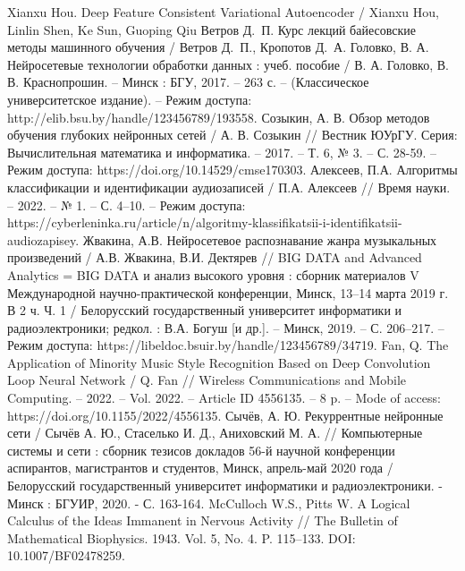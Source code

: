 \begin{thebibliography}{99}
 Xianxu Hou. Deep Feature Consistent Variational Autoencoder / Xianxu Hou, Linlin Shen, Ke Sun, Guoping Qiu
 Ветров Д.~П. Курс лекций байесовские методы машинного обучения / Ветров Д.~П., Кропотов Д.~А.
 Головко, В. А. Нейросетевые технологии обработки данных : учеб. пособие / В. А. Головко, В. В. Краснопрошин. – Минск : БГУ, 2017. – 263 с. – (Классическое университетское издание). – Режим доступа: http://elib.bsu.by/handle/123456789/193558.
 Созыкин, А. В. Обзор методов обучения глубоких нейронных сетей / А. В. Созыкин // Вестник ЮУрГУ. Серия: Вычислительная математика и информатика. – 2017. – Т. 6, № 3. – С. 28-59. – Режим доступа: https://doi.org/10.14529/cmse170303.
 Алексеев, П.А. Алгоритмы классификации и идентификации аудиозаписей / П.А. Алексеев // Время науки. – 2022. – № 1. – С. 4–10. – Режим доступа: https://cyberleninka.ru/article/n/algoritmy-klassifikatsii-i-identifikatsii-audiozapisey.
 Жвакина, А.В. Нейросетевое распознавание жанра музыкальных произведений / А.В.  Жвакина, В.И. Дектярев // BIG DATA and Advanced Analytics = BIG DATA и анализ высокого уровня : сборник материалов V Международной научно-практической конференции, Минск, 13–14 марта 2019 г. В 2 ч. Ч. 1 / Белорусский государственный университет информатики и радиоэлектроники; редкол. : В.А. Богуш [и др.]. – Минск, 2019. – С. 206–217. – Режим доступа: https://libeldoc.bsuir.by/handle/123456789/34719.
 Fan, Q. The Application of Minority Music Style Recognition Based on Deep Convolution Loop Neural Network / Q. Fan // Wireless Communications and Mobile Computing. – 2022. – Vol. 2022. – Article ID 4556135. – 8 p. – Mode of access: https://doi.org/10.1155/2022/4556135.
 Сычёв, А. Ю. Рекуррентные нейронные сети / Сычёв А. Ю., Стаселько И. Д., Аниховский М. А. // Компьютерные системы и сети : сборник тезисов докладов 56-й научной конференции аспирантов, магистрантов и студентов, Минск, апрель-май 2020 года / Белорусский государственный университет информатики и радиоэлектроники. - Минск : БГУИР, 2020. - С. 163-164.
 McCulloch W.S., Pitts W. A Logical Calculus of the Ideas Immanent in Nervous
Activity // The Bulletin of Mathematical Biophysics. 1943. Vol. 5, No. 4. P. 115–133.
DOI: 10.1007/BF02478259.
\end{thebibliography}
